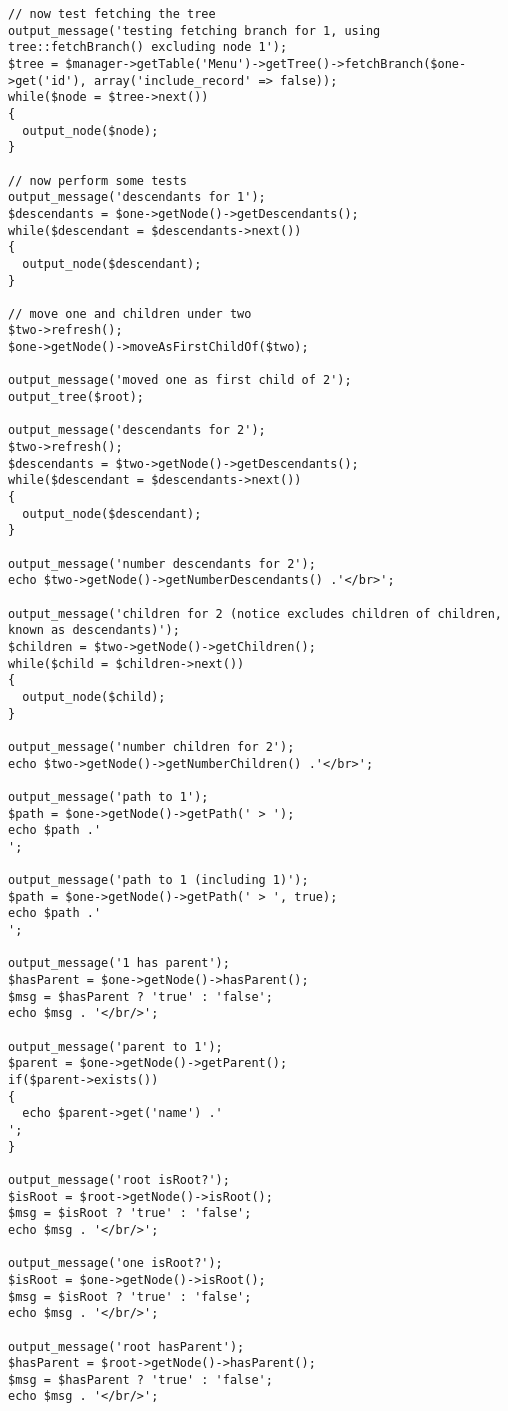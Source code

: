 \documentclass[11pt,a4paper]{report}
\begin{document}
\begin{verbatim}
// now test fetching the tree
output_message('testing fetching branch for 1, using tree::fetchBranch() excluding node 1');
$tree = $manager->getTable('Menu')->getTree()->fetchBranch($one->get('id'), array('include_record' => false));
while($node = $tree->next())
{
  output_node($node);
}

// now perform some tests
output_message('descendants for 1');
$descendants = $one->getNode()->getDescendants();
while($descendant = $descendants->next())
{
  output_node($descendant);
}

// move one and children under two
$two->refresh();
$one->getNode()->moveAsFirstChildOf($two);

output_message('moved one as first child of 2');
output_tree($root);

output_message('descendants for 2');
$two->refresh();
$descendants = $two->getNode()->getDescendants();
while($descendant = $descendants->next())
{
  output_node($descendant);
}

output_message('number descendants for 2');
echo $two->getNode()->getNumberDescendants() .'</br>';

output_message('children for 2 (notice excludes children of children, known as descendants)');
$children = $two->getNode()->getChildren();
while($child = $children->next())
{
  output_node($child);
}

output_message('number children for 2');
echo $two->getNode()->getNumberChildren() .'</br>';

output_message('path to 1');
$path = $one->getNode()->getPath(' > ');
echo $path .'
';

output_message('path to 1 (including 1)');
$path = $one->getNode()->getPath(' > ', true);
echo $path .'
';

output_message('1 has parent');
$hasParent = $one->getNode()->hasParent();
$msg = $hasParent ? 'true' : 'false';
echo $msg . '</br/>';

output_message('parent to 1');
$parent = $one->getNode()->getParent();
if($parent->exists())
{
  echo $parent->get('name') .'
';
}

output_message('root isRoot?');
$isRoot = $root->getNode()->isRoot();
$msg = $isRoot ? 'true' : 'false';
echo $msg . '</br/>';

output_message('one isRoot?');
$isRoot = $one->getNode()->isRoot();
$msg = $isRoot ? 'true' : 'false';
echo $msg . '</br/>';

output_message('root hasParent');
$hasParent = $root->getNode()->hasParent();
$msg = $hasParent ? 'true' : 'false';
echo $msg . '</br/>';


\end{verbatim}
\end{document}
